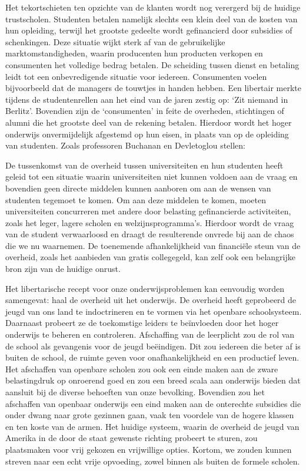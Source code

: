 \documentclass[
  a5paper,
  smalldemyvopaper,10pt,twoside,onecolumn,openright,extrafontsizes,hidelinks]{memoir}
\renewenvironment{quote}%
               {\list{}{\rightmargin=.6cm\leftmargin=.6cm}%
                \itshape \item[]}%
               {\endlist}
\begin{document}
Het tekortschieten ten opzichte van de klanten wordt nog verergerd bij
de huidige trustscholen. Studenten betalen namelijk slechts een klein
deel van de kosten van hun opleiding, terwijl het grootste gedeelte
wordt gefinancierd door subsidies of schenkingen. Deze situatie wijkt
sterk af van de gebruikelijke marktomstandigheden, waarin producenten
hun producten verkopen en consumenten het volledige bedrag betalen. De
scheiding tussen dienst en betaling leidt tot een onbevredigende
situatie voor iedereen. Consumenten voelen bijvoorbeeld dat de managers
de touwtjes in handen hebben. Een libertair merkte tijdens de
studentenrellen aan het eind van de jaren zestig op: `Zit niemand in
Berlitz'. Bovendien zijn de `consumenten' in feite de overheden,
stichtingen of alumni die het grootste deel van de rekening betalen.
Hierdoor wordt het hoger onderwijs onvermijdelijk afgestemd op hun
eisen, in plaats van op de opleiding van studenten. Zoals professoren
Buchanan en Devletoglou stellen:

\begin{quote}
De tussenkomst van de overheid tussen universiteiten en hun studenten
heeft geleid tot een situatie waarin universiteiten niet kunnen voldoen
aan de vraag en bovendien geen directe middelen kunnen aanboren om aan
de wensen van studenten tegemoet te komen. Om aan deze middelen te
komen, moeten universiteiten concurreren met andere door belasting
gefinancierde activiteiten, zoals het leger, lagere scholen en
welzijnsprogramma's. Hierdoor wordt de vraag van de student verwaarloosd
en draagt de resulterende onvrede bij aan de chaos die we nu waarnemen.
De toenemende afhankelijkheid van financiële steun van de overheid,
zoals het aanbieden van gratis collegegeld, kan zelf ook een belangrijke
bron zijn van de huidige onrust.
\end{quote}

Het libertarische recept voor onze onderwijsproblemen kan eenvoudig
worden samengevat: haal de overheid uit het onderwijs. De overheid heeft
geprobeerd de jeugd van ons land te indoctrineren en te vormen via het
openbare schoolsysteem. Daarnaast probeert ze de toekomstige leiders te
beïnvloeden door het hoger onderwijs te beheren en controleren.
Afschaffing van de leerplicht zou de rol van de school als gevangenis
voor de jeugd beëindigen. Dit zou iedereen die beter af is buiten de
school, de ruimte geven voor onafhankelijkheid en een productief leven.
Het afschaffen van openbare scholen zou ook een einde maken aan de zware
belastingdruk op onroerend goed en zou een breed scala aan onderwijs
bieden dat aansluit bij de diverse behoeften van onze bevolking.
Bovendien zou het afschaffen van openbaar onderwijs een eind maken aan
de onterechte subsidies die onder dwang naar grote gezinnen gaan, vaak
ten voordele van de hogere klassen en ten koste van de armen. Het
huidige systeem, waarin de overheid de jeugd van Amerika in de door de
staat gewenste richting probeert te sturen, zou plaatsmaken voor vrij
gekozen en vrijwillige opties. Kortom, we zouden kunnen streven naar een
echt vrije opvoeding, zowel binnen als buiten de formele scholen.
\end{document}
